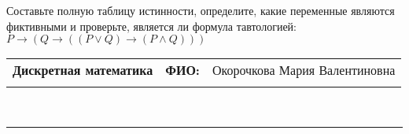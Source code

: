 \documentclass[10pt]{exam}
\newcommand{\class}{Дискретная математика}
\newcommand{\examdate}{}
\begin{document}
\begin{questions}
\begin{enumerate}[a)]
\end{enumerate}\question Составьте полную таблицу истинности, определите, какие переменные являются фиктивными и проверьте, является ли формула тавтологией:
$ P \rightarrow (Q \rightarrow ((P \lor Q) \rightarrow (P \land Q)))$

\end{questions}
\newpage
\begin{flushright}
\begin{tabular}{p{2.8in} r l}
\textbf{\class} & \textbf{ФИО:} &Окорочкова Мария Валентиновна
\\

\textbf{\examdate} &&\\
\end{tabular}\\
\end{flushright}
\rule[1ex]{\textwidth}{.1pt}
\end{document}
